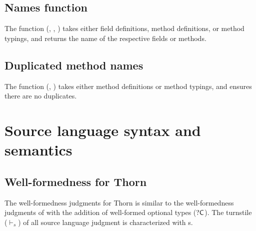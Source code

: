 \documentclass[acmsmall, anonymous, authordraft, review]{acmart} %
\begin{document}
\begin{mathpar}

\end{mathpar}

\subsection{Names function}

The  function (, , ) takes either field definitions, method definitions, or 
method typings, and returns the name of the respective fields or methods.

\subsection{Duplicated method names}

The  function (, ) takes either
method definitions or method typings, and ensures there are no duplicates.


\section{Source language syntax and semantics}

\subsection*{Well-formedness for Thorn}

The well-formedness judgments for Thorn is similar to the well-formedness
judgments of \kafka with the addition of well-formed optional types
($\CW$). The turnstile ($\vdash_{\!s}$) of all source language judgment is
characterized with s.
\end{document}
